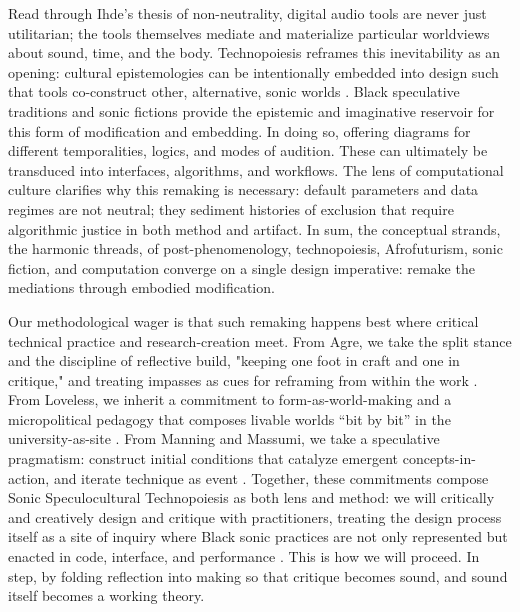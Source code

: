 Read through Ihde’s thesis of non-neutrality, digital audio tools are never just utilitarian; the tools themselves mediate and materialize particular worldviews about sound, time, and the body. Technopoiesis reframes this inevitability as an opening: cultural epistemologies can be intentionally embedded into design such that tools co-construct other, alternative, sonic worlds \parencite{Guerra_Ostergaard_2017}. Black speculative traditions and sonic fictions provide the epistemic and imaginative reservoir for this form of modification and embedding. In doing so, offering diagrams for different temporalities, logics, and modes of audition. These can ultimately be transduced into interfaces, algorithms, and workflows. The lens of computational culture clarifies why this remaking is necessary: default parameters and data regimes are not neutral; they sediment histories of exclusion that require algorithmic justice in both method and artifact. In sum, the conceptual strands, the harmonic threads, of post-phenomenology, technopoiesis, Afrofuturism, sonic fiction, and computation converge on a single design imperative: remake the mediations through embodied modification.

Our methodological wager is that such remaking happens best where critical technical practice and research-creation meet. From Agre, we take the split stance and the discipline of reflective build, "keeping one foot in craft and one in critique," and treating impasses as cues for reframing from within the work \parencite[p.~155]{Agre_1998}. From Loveless, we inherit a commitment to form-as-world-making and a micropolitical pedagogy that composes livable worlds “bit by bit” in the university-as-site \parencite[p.~102]{Loveless_2019}. From Manning and Massumi, we take a speculative pragmatism: construct initial conditions that catalyze emergent concepts-in-action, and iterate technique as event \parencite[p.~89]{Manning_Massumi_2014}. Together, these commitments compose Sonic Speculocultural Technopoiesis as both lens and method: we will critically and creatively design and critique with practitioners, treating the design process itself as a site of inquiry where Black sonic practices are not only represented but enacted in code, interface, and performance \parencite{Guerra_Ostergaard_2017}. This is how we will proceed. In step, by folding reflection into making so that critique becomes sound, and sound itself becomes a working theory.